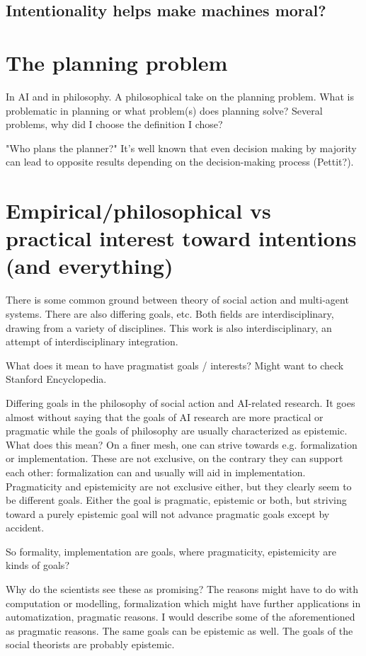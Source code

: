 \subsection{Intentionality helps make machines moral?}


\section{The planning problem}
In AI and in philosophy. A philosophical take on the planning problem. What is problematic in planning or what problem(s) does planning solve? Several problems, why did I choose the definition I chose?

"Who plans the planner?" It's well known that even decision making by majority can lead to opposite results depending on the decision-making process (Pettit?).


\section{Empirical/philosophical vs practical interest toward intentions (and everything)}
There is some common ground between theory of social action and multi-agent systems. There are also differing goals, etc. Both fields are interdisciplinary, drawing from a variety of disciplines. This work is also interdisciplinary, an attempt of interdisciplinary integration.

What does it mean to have pragmatist goals / interests? Might want to check Stanford Encyclopedia.

Differing goals in the philosophy of social action and AI-related research. It goes almost without saying that the goals of AI research are more practical or pragmatic while the goals of philosophy are usually characterized as epistemic. What does this mean? On a finer mesh, one can strive towards e.g. formalization or implementation. These are not exclusive, on the contrary they can support each other: formalization can and usually will aid in implementation. Pragmaticity and epistemicity are not exclusive either, but they clearly seem to be different goals. Either the goal is pragmatic, epistemic or both, but striving toward a purely epistemic goal will not advance pragmatic goals except by accident.

So formality, implementation are goals, where pragmaticity, epistemicity are kinds of goals?

Why do the scientists see these as promising? The reasons might have to do with computation or modelling, formalization which might have further applications in automatization, pragmatic reasons. I would describe some of the aforementioned as pragmatic reasons. The same goals can be epistemic as well. The goals of the social theorists are probably epistemic.

